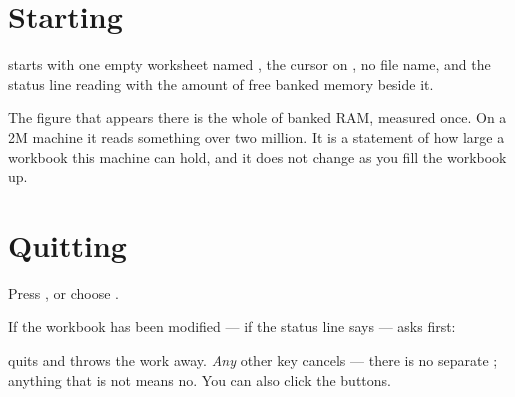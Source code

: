 \section{Starting}

\ccprod{} starts with one empty worksheet named , the cursor on
, no file name, and the status line reading  with the
amount of free banked memory beside it.

\begin{ccfigure}
\caption{The status line at startup on a 512K machine}
\end{ccfigure}

The figure that appears there is the whole of banked RAM, measured once. On a
2M machine it reads something over two million. It is a statement of how large
a workbook this machine can hold, and it does not change as you fill the
workbook up.

\section{Quitting}

Press , or choose .

If the workbook has been modified --- if the status line says  ---
\ccprod{} asks first:

\begin{ccfigure}
\caption{The confirmation shown when quitting with unsaved changes}
\label{fig:quitconfirm}
\end{ccfigure}

 quits and throws the work away. \emph{Any} other key cancels --- there
is no separate ; anything that is not  means no. You can also
click the buttons.

